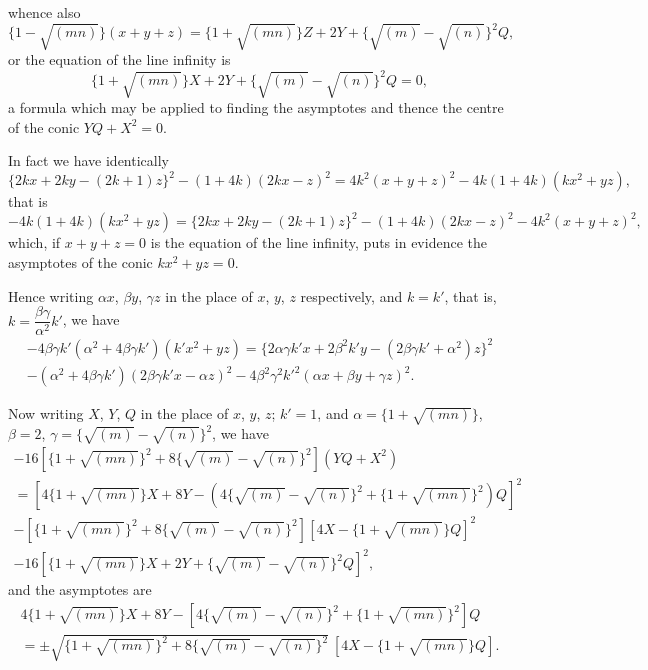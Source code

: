\documentclass[11pt,a4paper]{article}
\theoremstyle{plain}
\begin{document}
whence also
\begin{equation}
\{1 - \sqrt{(mn)}\}(x + y + z) = \{1 + \sqrt{(mn)}\}Z + 2Y + \{\sqrt{(m)} - \sqrt{(n)}\}^2 Q,
\end{equation}
or the equation of the line infinity is
\begin{equation}
\{1 + \sqrt{(mn)}\}X + 2Y + \{\sqrt{(m)} - \sqrt{(n)}\}^2 Q = 0,
\end{equation}
a formula which may be applied to finding the asymptotes and thence the centre of the conic $YQ + X^2 = 0$.

In fact we have identically
\begin{equation}
\{2kx + 2ky - (2k+1)z\}^2 - (1+4k)(2kx - z)^2 = 4k^2(x+y+z)^2 - 4k(1+4k)(kx^2 + yz),
\end{equation}
that is
\begin{equation}
-4k(1+4k)(kx^2 + yz) = \{2kx + 2ky - (2k+1)z\}^2 - (1+4k)(2kx - z)^2 - 4k^2(x+y+z)^2,
\end{equation}
which, if $x + y + z = 0$ is the equation of the line infinity, puts in evidence the asymptotes of the conic $kx^2 + yz = 0$.

\newpage
\setcounter{equation}{30}

Hence writing $\alpha x$, $\beta y$, $\gamma z$ in the place of $x$, $y$, $z$ respectively, and $k = k'$, that is, $k = \dfrac{\beta\gamma}{\alpha^2}k'$, we have
\begin{multline}
-4\beta\gamma k'(\alpha^2 + 4\beta\gamma k')(k'x^2 + yz) = \{2\alpha\gamma k'x + 2\beta^2 k'y - (2\beta\gamma k' + \alpha^2)z\}^2 \\
- (\alpha^2 + 4\beta\gamma k')(2\beta\gamma k'x - \alpha z)^2 - 4\beta^2\gamma^2 k'^2(\alpha x + \beta y + \gamma z)^2.
\end{multline}

Now writing $X$, $Y$, $Q$ in the place of $x$, $y$, $z$; $k' = 1$, and $\alpha = \{1 + \sqrt{(mn)}\}$, $\beta = 2$, $\gamma = \{\sqrt{(m)} - \sqrt{(n)}\}^2$, we have
\begin{multline}
-16[\{1 + \sqrt{(mn)}\}^2 + 8\{\sqrt{(m)} - \sqrt{(n)}\}^2](YQ + X^2) \\
= [4\{1 + \sqrt{(mn)}\}X + 8Y - (4\{\sqrt{(m)} - \sqrt{(n)}\}^2 + \{1 + \sqrt{(mn)}\}^2)Q]^2 \\
- [\{1 + \sqrt{(mn)}\}^2 + 8\{\sqrt{(m)} - \sqrt{(n)}\}^2][4X - \{1 + \sqrt{(mn)}\}Q]^2 \\
- 16[\{1 + \sqrt{(mn)}\}X + 2Y + \{\sqrt{(m)} - \sqrt{(n)}\}^2 Q]^2,
\end{multline}
and the asymptotes are
\begin{multline}
4\{1 + \sqrt{(mn)}\}X + 8Y - [4\{\sqrt{(m)} - \sqrt{(n)}\}^2 + \{1 + \sqrt{(mn)}\}^2]Q \\
= \pm\sqrt{\{1 + \sqrt{(mn)}\}^2 + 8\{\sqrt{(m)} - \sqrt{(n)}\}^2}\ [4X - \{1 + \sqrt{(mn)}\}Q].
\end{multline}
\end{document}
